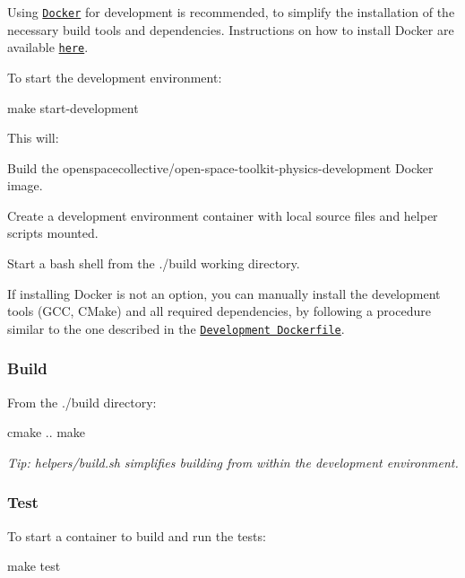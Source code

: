 Using \href{https://www.docker.com}{\tt Docker} for development is recommended, to simplify the installation of the necessary build tools and dependencies. Instructions on how to install Docker are available \href{https://docs.docker.com/install/}{\tt here}.

To start the development environment\+:


\begin{DoxyCode}
make start-development
\end{DoxyCode}


This will\+:


\begin{DoxyEnumerate}
\item Build the {\ttfamily openspacecollective/open-\/space-\/toolkit-\/physics-\/development} Docker image.
\item Create a development environment container with local source files and helper scripts mounted.
\item Start a {\ttfamily bash} shell from the {\ttfamily ./build} working directory.
\end{DoxyEnumerate}

If installing Docker is not an option, you can manually install the development tools (G\+CC, C\+Make) and all required dependencies, by following a procedure similar to the one described in the \href{./docker/development/Dockerfile}{\tt Development Dockerfile}.

\subsubsection*{Build}

From the {\ttfamily ./build} directory\+:


\begin{DoxyCode}
cmake ..
make
\end{DoxyCode}


{\itshape Tip\+: {\ttfamily helpers/build.\+sh} simplifies building from within the development environment.}

\subsubsection*{Test}

To start a container to build and run the tests\+:


\begin{DoxyCode}
make test
\end{DoxyCode}


